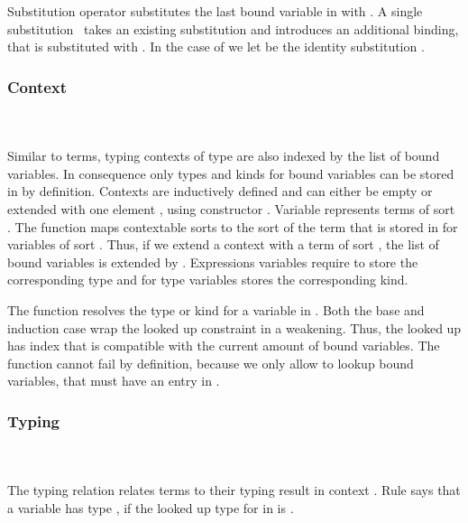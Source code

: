 \noindent Substitution operator  \Data{[}  \Data{]} substitutes the last bound variable in  with .
\Fsubs
A single substitution \Fsinglesub\ takes an existing substitution  and introduces an additional binding, that is substituted with . In the case of \Data{\_[\_]} we let  be the identity substitution \Fidsub.

\subsubsection{Context}\hfill\\\\
Similar to terms, typing contexts  of type   are also indexed by the list of bound variables. In consequence only types and kinds for bound variables can be stored in  by definition.
\FCtx
Contexts are inductively defined and can either be empty  or extended with one element , using constructor   . Variable  represents terms of sort  . 
\noindent The function  maps contextable sorts  to the sort of the term that is stored in  for variables of sort . Thus, if we extend a context with a term of sort  , the list of bound variables is extended by .
\Fkind
Expressions variables require  to store the corresponding type and for type variables  stores the corresponding kind. 

\noindent The  function resolves the type or kind for a variable  in .
\Flookup
Both the base and induction case wrap the looked up constraint in a weakening. Thus, the looked up  has index  that is compatible with the current amount of bound variables. The  function cannot fail by definition, because we only allow to lookup bound variables, that must have an entry in .

\subsubsection{Typing}\hfill\\\\
The typing relation    \Data{:}  relates terms  to their typing result  in context .
\FTyping
Rule  says that a variable   has type , if the looked up type for  in  is . 

